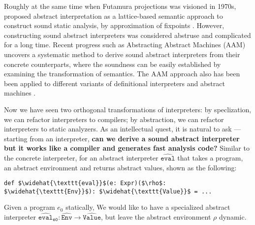 Roughly at the same time when Futamura projections was visioned in 1970s,
\citeauthor{DBLP:conf/popl/CousotC77} proposed abstract interpretation as a
lattice-based semantic approach to construct sound static analysis, by
approximation of fixpoints \cite{DBLP:conf/popl/CousotC77}. However,
constructing sound abstract interpreters was considered abstruse and complicated
for a long time.
Recent progress such as Abstracting Abstract Machines (AAM)
uncovers a systematic method to derive sound abstract interpreters from their
concrete counterparts, where the soundness can be easily established by
examining the transformation of semantics.
The AAM approach also has been been applied to different variants of
definitional interpreters and abstract machines \cite{DBLP:journals/jfp/HornM12,
DBLP:conf/icfp/HornM10, DBLP:journals/pacmpl/DaraisLNH17}.

Now we have seen two orthogonal transformations of interpreters: by
speclization, we can refactor interpreters to compilers; by abstraction, we can
refactor interpreters to static analyzers. As an intellectual quest, it is
natural to ask --- starting from an interpreter, \textbf{can we derive a sound
abstract interpreter but it works like a compiler and generates fast analysis
code?} Similar to the concrete interpreter, for an abstract interpreter
$\widehat{\texttt{eval}}$ that takes a program, an abstract environment and
returns abstract values, shown as the following:

\begin{lstlisting}
def $\widehat{\texttt{eval}}$(e: Expr)($\rho$: $\widehat{\texttt{Env}}$): $\widehat{\texttt{Value}}$ = ...
\end{lstlisting}

Given a program $e_0$ statically, We would like to have a specialized abstract
interpreter $\widehat{\texttt{eval}}_{\texttt{e0}} : \widehat{\texttt{Env}} \to
\widehat{\texttt{Value}}$, but leave the abstract environment $\rho$ dynamic.

